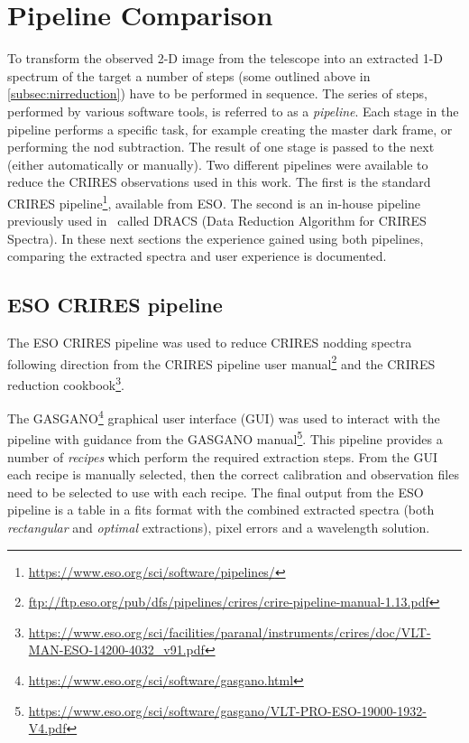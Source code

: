 
\section{Pipeline Comparison}
\label{sec:pipelines}
To transform the observed 2-D image from the telescope into an extracted 1-D spectrum of the target a number of steps (some outlined above in \cref{subsec:nirreduction}) have to be performed in sequence. The series of steps, performed by various software tools, is referred to as a \emph{pipeline}.
Each stage in the pipeline performs a specific task, for example creating the master dark frame, or performing the nod subtraction.
The result of one stage is passed to the next (either automatically or manually).
Two different pipelines were available to reduce the {CRIRES} observations used in this work.
The first is the standard {CRIRES} pipeline\footnote{\href{https://www.eso.org/sci/software/pipelines/}{https://www.eso.org/sci/software/pipelines/}}, available from {ESO}.
The second is an in-house pipeline previously used in~\citet{figueira_radial_2010} called {DRACS} (Data Reduction Algorithm for {CRIRES} Spectra). In these next sections the experience gained using both pipelines, comparing the extracted spectra and user experience is documented.


\subsection{{ESO} {CRIRES} pipeline}
\label{subsec:eso-crires}
The {ESO} {CRIRES} pipeline was used to reduce {CRIRES} nodding spectra following direction from the {CRIRES} pipeline user manual\footnote{\href{ftp://ftp.eso.org/pub/dfs/pipelines/crires/crire-pipeline-manual-1.13.pdf}{ftp://ftp.eso.org/pub/dfs/pipelines/crires/crire-pipeline-manual-1.13.pdf}} and the {CRIRES} reduction cookbook\footnote{\href{https://www.eso.org/sci/facilities/paranal/instruments/crires/doc/VLT-MAN-{ESO}-14200-4032\_v91.pdf}{https://www.eso.org/sci/facilities/paranal/instruments/crires/doc/VLT-MAN-{ESO}-14200-4032\_v91.pdf}}.

The GASGANO\footnote{\href{https://www.eso.org/sci/software/gasgano.html}{https://www.eso.org/sci/software/gasgano.html}} graphical user interface (GUI) was used to interact with the pipeline with guidance from the {GASGANO} manual\footnote{\href{https://www.eso.org/sci/software/gasgano/VLT-PRO-{ESO}-19000-1932-V4.pdf}{https://www.eso.org/sci/software/gasgano/VLT-PRO-{ESO}-19000-1932-V4.pdf}}.
This pipeline provides a number of \emph{recipes} which perform the required extraction steps.
From the GUI each recipe is manually selected, then the correct calibration and observation files need to be selected to use with each recipe.
The final output from the {ESO} pipeline is a table in a fits format with the combined extracted spectra (both \emph{rectangular} and \emph{optimal} extractions), pixel errors and a wavelength solution.

